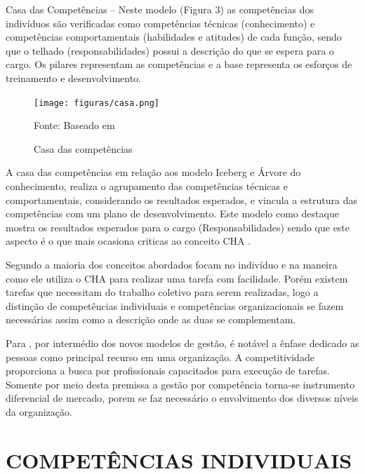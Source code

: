 \begin{alineas}
	\item	Casa das Competências  – Neste modelo (Figura 3) as competências dos indivíduos são verificadas como competências técnicas (conhecimento) e competências comportamentais (habilidades e atitudes) de cada função, sendo que o telhado (responsabilidades) possui a descrição do que se espera para o cargo. Os pilares representam as competências e a base representa os esforços de treinamento e desenvolvimento.
	\vspace{30mm}

	\begin{figure}[htbp]
		\centering
		\caption{Casa das competências}
		\texttt{[image: figuras/casa.png]}

		\label{fig:CASA}
		\footnotesize Fonte: Baseado em 
	\end{figure}

\end{alineas}

A casa das competências em relação aos modelo Iceberg e Árvore do conhecimento, realiza o agrupamento das competências técnicas e comportamentais, considerando os resultados esperados, e vincula a estrutura das competências com um plano de desenvolvimento. Este modelo como destaque mostra os resultados esperados para o cargo (Responsabilidades) sendo que este aspecto é o que mais ocasiona criticas ao conceito CHA \cite{Masih2008gestao}.

	Segundo  a maioria dos conceitos abordados focam no indivíduo e na maneira como ele utiliza o CHA para realizar uma tarefa com facilidade. Porém existem tarefas que necessitam do trabalho coletivo para serem realizadas, logo a distinção de competências individuais e competências organizacionais se fazem necessárias assim como a descrição onde as duas se complementam.

	Para , por intermédio dos novos modelos de gestão, é notável a ênfase dedicado as pessoas como principal recurso em uma organização. A competitividade proporciona a busca por profissionais capacitados para execução de tarefas. Somente por meio desta premissa a gestão por competência torna-se instrumento diferencial de mercado, porem se faz necessário o envolvimento dos diversos níveis da organização.

\section{COMPETÊNCIAS INDIVIDUAIS}

